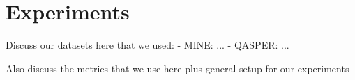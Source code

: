 \section{Experiments}
Discuss our datasets here that we used:
- MINE: ...
- QASPER: ...

Also discuss the metrics that we use here plus general setup for our experiments